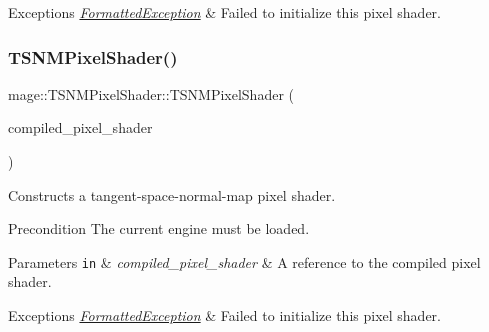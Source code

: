 \begin{DoxyExceptions}{Exceptions}
{\em \hyperlink{structmage_1_1_formatted_exception}{Formatted\+Exception}} & Failed to initialize this pixel shader. \\
\hline
\end{DoxyExceptions}
\hypertarget{classmage_1_1_t_s_n_m_pixel_shader_a2e2d9c729d40ebc12feff7de7437b0e2}{}\label{classmage_1_1_t_s_n_m_pixel_shader_a2e2d9c729d40ebc12feff7de7437b0e2} 
\subsubsection{\texorpdfstring{T\+S\+N\+M\+Pixel\+Shader()}{TSNMPixelShader()}\hspace{0.1cm}{\footnotesize\ttfamily [3/6]}}
{\footnotesize\ttfamily mage\+::\+T\+S\+N\+M\+Pixel\+Shader\+::\+T\+S\+N\+M\+Pixel\+Shader (\begin{DoxyParamCaption}\item[{const \hyperlink{structmage_1_1_compiled_pixel_shader}{Compiled\+Pixel\+Shader} \&}]{compiled\+\_\+pixel\+\_\+shader }\end{DoxyParamCaption})\hspace{0.3cm}{\ttfamily [explicit]}}

Constructs a tangent-\/space-\/normal-\/map pixel shader.

\begin{DoxyPrecond}{Precondition}
The current engine must be loaded. 
\end{DoxyPrecond}

\begin{DoxyParams}[1]{Parameters}
\mbox{\tt in}  & {\em compiled\+\_\+pixel\+\_\+shader} & A reference to the compiled pixel shader. \\
\hline
\end{DoxyParams}

\begin{DoxyExceptions}{Exceptions}
{\em \hyperlink{structmage_1_1_formatted_exception}{Formatted\+Exception}} & Failed to initialize this pixel shader. \\
\hline
\end{DoxyExceptions}
\hypertarget{classmage_1_1_t_s_n_m_pixel_shader_aa04056a841bae6945546772dd298c5f4}{}\label{classmage_1_1_t_s_n_m_pixel_shader_aa04056a841bae6945546772dd298c5f4} 
